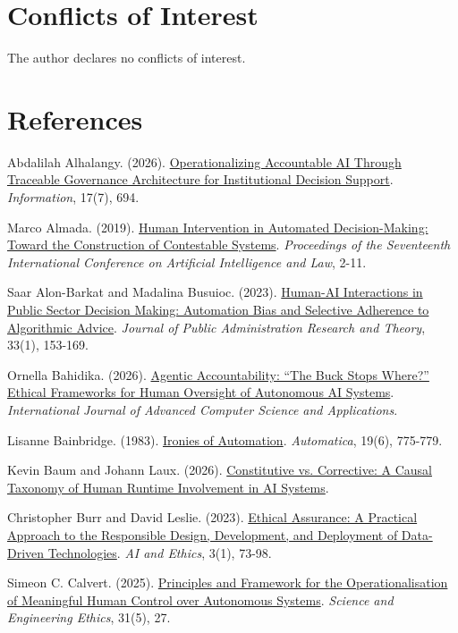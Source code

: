\documentclass[11pt]{article}
\newenvironment{TAEReferences}{%
  \begin{list}{}{%
    \renewcommand{\makelabel}[1]{}%
    \setlength{\labelwidth}{0pt}%
    \setlength{\labelsep}{0pt}%
    \setlength{\leftmargin}{0.5in}%
    \setlength{\itemindent}{-0.5in}%
    \setlength{\itemsep}{0.45em}%
    \setlength{\parsep}{0pt}%
    \setlength{\topsep}{0.25em}%
  }%
}{\end{list}}
\begin{document}
\section*{Conflicts of Interest}
The author declares no conflicts of interest.
\FloatBarrier
\section*{References}
\begin{TAEReferences}
\item Abdalilah Alhalangy. (2026). \href{https://doi.org/10.3390/info17070694}{Operationalizing Accountable AI Through Traceable Governance Architecture for Institutional Decision Support}. \emph{Information}, 17(7), 694.
\item Marco Almada. (2019). \href{https://doi.org/10.1145/3322640.3326699}{Human Intervention in Automated Decision-Making: Toward the Construction of Contestable Systems}. \emph{Proceedings of the Seventeenth International Conference on Artificial Intelligence and Law}, 2-11.
\item Saar Alon-Barkat and Madalina Busuioc. (2023). \href{https://doi.org/10.1093/jopart/muac007}{Human-AI Interactions in Public Sector Decision Making: Automation Bias and Selective Adherence to Algorithmic Advice}. \emph{Journal of Public Administration Research and Theory}, 33(1), 153-169.
\item Ornella Bahidika. (2026). \href{https://doi.org/10.14569/IJACSA.2026.0170502}{Agentic Accountability: ``The Buck Stops Where?'' Ethical Frameworks for Human Oversight of Autonomous AI Systems}. \emph{International Journal of Advanced Computer Science and Applications}.
\item Lisanne Bainbridge. (1983). \href{https://doi.org/10.1016/0005-1098(83)90046-8}{Ironies of Automation}. \emph{Automatica}, 19(6), 775-779.
\item Kevin Baum and Johann Laux. (2026). \href{https://doi.org/10.48550/arXiv.2603.19213}{Constitutive vs. Corrective: A Causal Taxonomy of Human Runtime Involvement in AI Systems}.
\item Christopher Burr and David Leslie. (2023). \href{https://doi.org/10.1007/s43681-022-00178-0}{Ethical Assurance: A Practical Approach to the Responsible Design, Development, and Deployment of Data-Driven Technologies}. \emph{AI and Ethics}, 3(1), 73-98.
\item Simeon C. Calvert. (2025). \href{https://doi.org/10.1007/s11948-025-00554-z}{Principles and Framework for the Operationalisation of Meaningful Human Control over Autonomous Systems}. \emph{Science and Engineering Ethics}, 31(5), 27.

\end{TAEReferences}
\end{document}

